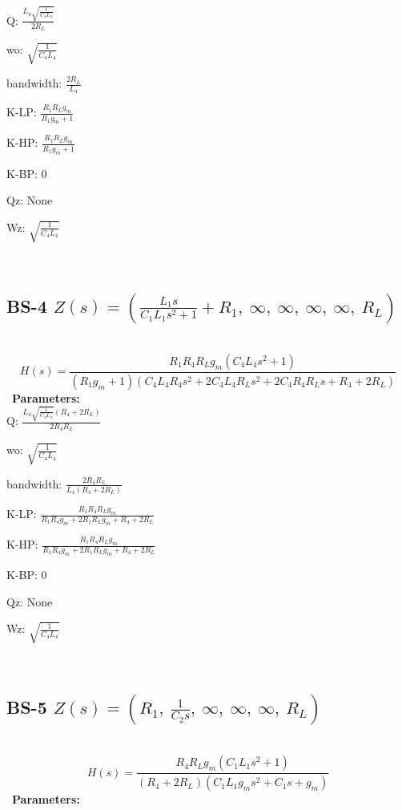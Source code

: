 \documentclass{article}
\begin{document}
Q: $\frac{L_{4} \sqrt{\frac{1}{C_{4} L_{4}}}}{2 R_{L}}$\ 

wo: $\sqrt{\frac{1}{C_{4} L_{4}}}$\ 

bandwidth: $\frac{2 R_{L}}{L_{4}}$\ 

K-LP: $\frac{R_{1} R_{L} g_{m}}{R_{1} g_{m} + 1}$\ 

K-HP: $\frac{R_{1} R_{L} g_{m}}{R_{1} g_{m} + 1}$\ 

K-BP: $0$\ 

Qz: $\text{None}$\ 

Wz: $\sqrt{\frac{1}{C_{4} L_{4}}}$\ 

\ 

\subsection{BS-4 $Z(s) = \left( \frac{L_{1} s}{C_{1} L_{1} s^{2} + 1} + R_{1}, \  \infty, \  \infty, \  \infty, \  \infty, \  R_{L}\right)$ } \ 
\textbf{\[H(s) = \frac{R_{1} R_{4} R_{L} g_{m} \left(C_{4} L_{4} s^{2} + 1\right)}{\left(R_{1} g_{m} + 1\right) \left(C_{4} L_{4} R_{4} s^{2} + 2 C_{4} L_{4} R_{L} s^{2} + 2 C_{4} R_{4} R_{L} s + R_{4} + 2 R_{L}\right)}\] } \ 
\textbf{Parameters:}\\ 

Q: $\frac{L_{4} \sqrt{\frac{1}{C_{4} L_{4}}} \left(R_{4} + 2 R_{L}\right)}{2 R_{4} R_{L}}$\ 

wo: $\sqrt{\frac{1}{C_{4} L_{4}}}$\ 

bandwidth: $\frac{2 R_{4} R_{L}}{L_{4} \left(R_{4} + 2 R_{L}\right)}$\ 

K-LP: $\frac{R_{1} R_{4} R_{L} g_{m}}{R_{1} R_{4} g_{m} + 2 R_{1} R_{L} g_{m} + R_{4} + 2 R_{L}}$\ 

K-HP: $\frac{R_{1} R_{4} R_{L} g_{m}}{R_{1} R_{4} g_{m} + 2 R_{1} R_{L} g_{m} + R_{4} + 2 R_{L}}$\ 

K-BP: $0$\ 

Qz: $\text{None}$\ 

Wz: $\sqrt{\frac{1}{C_{4} L_{4}}}$\ 

\ 

\subsection{BS-5 $Z(s) = \left( R_{1}, \  \frac{1}{C_{2} s}, \  \infty, \  \infty, \  \infty, \  R_{L}\right)$ } \ 
\textbf{\[H(s) = \frac{R_{4} R_{L} g_{m} \left(C_{1} L_{1} s^{2} + 1\right)}{\left(R_{4} + 2 R_{L}\right) \left(C_{1} L_{1} g_{m} s^{2} + C_{1} s + g_{m}\right)}\] } \ 
\textbf{Parameters:}\\ 
\end{document}
